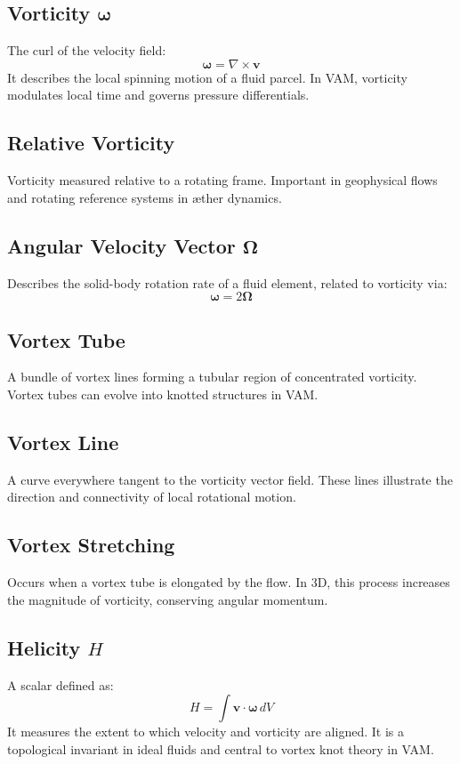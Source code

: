 \documentclass[12pt]{article}
\begin{document}
\subsection*{Vorticity $\boldsymbol{\omega}$}
The curl of the velocity field:
\[ \boldsymbol{\omega} = \nabla \times \mathbf{v} \]
It describes the local spinning motion of a fluid parcel. In VAM, vorticity modulates local time and governs pressure differentials.

\subsection*{Relative Vorticity}
Vorticity measured relative to a rotating frame. Important in geophysical flows and rotating reference systems in æther dynamics.

\subsection*{Angular Velocity Vector $\boldsymbol{\Omega}$}
Describes the solid-body rotation rate of a fluid element, related to vorticity via:
\[ \boldsymbol{\omega} = 2\boldsymbol{\Omega} \]

\subsection*{Vortex Tube}
A bundle of vortex lines forming a tubular region of concentrated vorticity. Vortex tubes can evolve into knotted structures in VAM.

\subsection*{Vortex Line}
A curve everywhere tangent to the vorticity vector field. These lines illustrate the direction and connectivity of local rotational motion.

\subsection*{Vortex Stretching}
Occurs when a vortex tube is elongated by the flow. In 3D, this process increases the magnitude of vorticity, conserving angular momentum.

\subsection*{Helicity $H$}
A scalar defined as:
\[ H = \int \mathbf{v} \cdot \boldsymbol{\omega} \, dV \]
It measures the extent to which velocity and vorticity are aligned. It is a topological invariant in ideal fluids and central to vortex knot theory in VAM.
\end{document}
